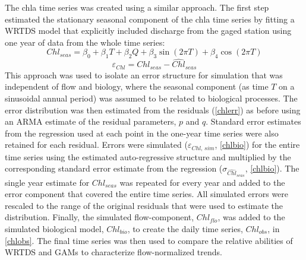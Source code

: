 \documentclass{svjour3}\usepackage[]{graphicx}\usepackage[]{color}
\begin{document}
The \ac{chla} time series was created using a similar approach.  The first step estimated the stationary seasonal component of the \ac{chla} time series by fitting a \ac{WRTDS} model \cite{Hirsch10} that explicitly included discharge from the gaged station using one year of data from the whole time series:
\begin{equation}\label{chlseas}
Chl_{seas} = \beta_0 + \beta_1 T + \beta_2 Q + \beta_3 \sin\left(2\pi T\right) + \beta_4 \cos\left(2\pi T\right)
\end{equation}
\begin{equation} \label{chlerr}
\varepsilon_{Chl} = Chl_{seas} - \widehat{Chl}_{seas}
\end{equation}
This approach was used to isolate an error structure for simulation that was independent of flow and biology, where the seasonal component (as time $T$ on a sinusoidal annual period) was assumed to be related to biological processes.  The error distribution was then estimated from the residuals (\cref{chlerr}) as before using an \ac{ARMA} estimate of the residual parameters, $p$ and $q$.  Standard error estimates from the regression used at each point in the one-year time series were also retained for each residual.  Errors were simulated ($\varepsilon_{Chl,\,sim}$, \cref{chlbio}) for the entire time series using the estimated auto-regressive structure and multiplied by the corresponding standard error estimate from the regression ($\sigma_{\widehat{Chl}_{seas}}$, \cref{chlbio}).  The single year estimate for $Chl_{seas}$ was repeated for every year and added to the error component that covered the entire time series.  All simulated errors were rescaled to the range of the original residuals that were used to estimate the distribution.  Finally, the simulated flow-component, $Chl_{flo}$, was added to the simulated biological model, $Chl_{bio}$, to create the daily time series, $Chl_{obs}$, in \cref{chlobs}.  The final time series was then used to compare the relative abilities of \ac{WRTDS} and \acp{GAM} to characterize flow-normalized trends.  

\end{document}
